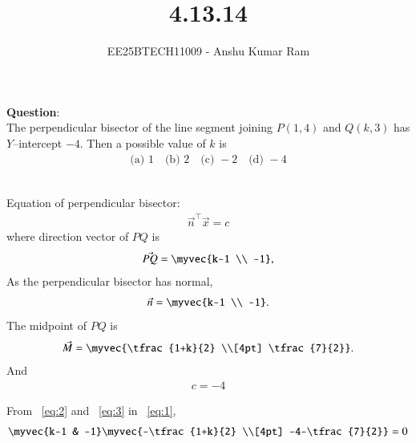\documentclass[journal]{IEEEtran}
\begin{document}

\vspace{3cm}

\title{4.13.14}
\author{EE25BTECH11009 - Anshu Kumar Ram }
\maketitle
{\let\newpage\relax\maketitle}

\renewcommand{\thefigure}{\theenumi}
\renewcommand{\thetable}{\theenumi}
\setlength{\intextsep}{10pt}

\renewcommand{\thetable}{\theenumi}

\textbf{Question}:\\
The perpendicular bisector of the line segment joining $P(1,4)$ and $Q(k,3)$ has $Y$--intercept $-4$. Then a possible value of $k$ is
\begin{align}
\text{(a) }1 \quad \text{(b) }2 \quad \text{(c) }-2 \quad \text{(d) }-4
\end{align}

\solution \\

Equation of perpendicular bisector:
\begin{align}
	\vec{n}^{\top}\vec{x} = c \label{eq:1}
\end{align}
where direction vector of $PQ$ is
\begin{align}
	\vec{PQ} = \myvec{k-1 \\ -1}, \label{eq:2}
\end{align}
As the perpendicular bisector has normal,
\begin{align}
\vec{n} = \myvec{k-1 \\ -1}.
\end{align}
The midpoint of $PQ$ is
\begin{align}
\vec{M} = \myvec{\tfrac{1+k}{2} \\[4pt] \tfrac{7}{2}}.
\end{align}
And 
\begin{align}
	c=-4 \label{eq:3}
\end{align}

From ~\eqref{eq:2} and ~\eqref{eq:3} in ~\eqref{eq:1}, 
\begin{align}
\myvec{k-1 & -1}\myvec{-\tfrac{1+k}{2} \\[4pt] -4-\tfrac{7}{2}}=0
\end{align}
\end{document}

